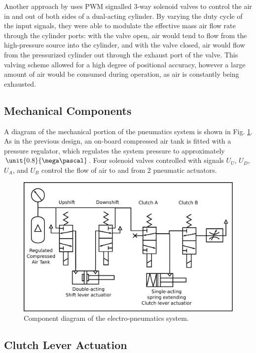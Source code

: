 Another approach by \citet{accurate_position} uses PWM signalled 3-way solenoid valves to control the air in and out of both sides of a dual-acting cylinder. By varying the duty cycle of the input signals, they were able to modulate the effective mass air flow rate through the cylinder ports: with the valve open, air would tend to flow from the high-pressure source into the cylinder, and with the valve closed, air would flow from the pressurized cylinder out through the exhaust port of the valve. This valving scheme allowed for a high degree of positional accuracy, however a large amount of air would be consumed during operation, as air is constantly being exhausted.

\subsection{Mechanical Components}

A diagram of the mechanical portion of the pneumatics system is shown in Fig. \ref{fig:pneumatics_design}. As in the previous design, an on-board compressed air tank is fitted with a pressure regulator, which regulates the system pressure to approximately $\unit{0.8}{\mega\pascal}$. Four solenoid valves controlled with signals $U_U$, $U_D$, $U_A$, and $U_B$ control the flow of air to and from 2 pneumatic actuators.

\begin{figure}[H]
	\centering
	\includegraphics[scale=0.5]{design/figures/pneumatics}
	\caption{Component diagram of the electro-pneumatics system.}
	\label{fig:pneumatics_design}
\end{figure}

\subsection{Clutch Lever Actuation}

